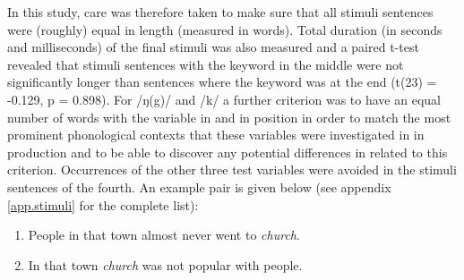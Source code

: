 In this study, care was therefore taken to make sure that all stimuli sentences were (roughly) equal in length (measured in words).
Total duration (in seconds and milliseconds) of the final stimuli was also measured and a paired t-test revealed that stimuli sentences with the keyword in the middle were not significantly longer than sentences where the keyword was at the end (t(23) = -0.129, p = 0.898).
For /ŋ(g)/ and /k/ a further criterion was to have an equal number of words with the variable in  and in  position in order to match the most prominent phonological contexts that these variables were investigated in in production and to be able to discover any potential differences in  related to this criterion.
Occurrences of the other three test variables were avoided in the stimuli sentences of the fourth.
An example pair is given below (see appendix \ref{app.stimuli} for the complete list):

\begin{enumerate}
	\item People in that town almost never went to \emph{church}.
	\item In that town \emph{church} was not popular with people.
\end{enumerate}

